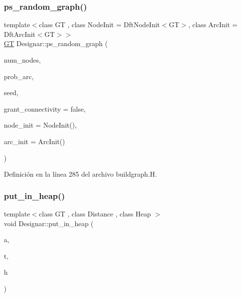 \subsubsection{\texorpdfstring{ps\+\_\+random\+\_\+graph()}{ps\_random\_graph()}\hspace{0.1cm}{\footnotesize\ttfamily [2/2]}}
{\footnotesize\ttfamily template$<$class GT , class Node\+Init  = Dft\+Node\+Init$<$\+G\+T$>$, class Arc\+Init  = Dft\+Arc\+Init$<$\+G\+T$>$$>$ \\
\hyperlink{demo-buildgraph_8_c_a3001c40d2c31ca87ed96cd7d1334a55e}{GT} Designar\+::ps\+\_\+random\+\_\+graph (\begin{DoxyParamCaption}\item[{\hyperlink{namespace_designar_aa72662848b9f4815e7bf31a7cf3e33d1}{nat\+\_\+t}}]{num\+\_\+nodes,  }\item[{\hyperlink{namespace_designar_aca2c32af26808dbec1f3a3071fad25ce}{real\+\_\+t}}]{prob\+\_\+arc,  }\item[{\hyperlink{namespace_designar_ad621b5646d45288c5d6a1e1dfe7531a8}{rng\+\_\+seed\+\_\+t}}]{seed,  }\item[{bool}]{grant\+\_\+connectivity = {\ttfamily false},  }\item[{Node\+Init \&\&}]{node\+\_\+init = {\ttfamily NodeInit()},  }\item[{Arc\+Init \&\&}]{arc\+\_\+init = {\ttfamily ArcInit()} }\end{DoxyParamCaption})}



Definición en la línea 285 del archivo buildgraph.\+H.

\mbox{\label{namespace_designar_a5a953a5892c101d5207d0844b367af70}} 
\subsubsection{\texorpdfstring{put\+\_\+in\+\_\+heap()}{put\_in\_heap()}}
{\footnotesize\ttfamily template$<$class GT , class Distance , class Heap $>$ \\
void Designar\+::put\+\_\+in\+\_\+heap (\begin{DoxyParamCaption}\item[{\hyperlink{namespace_designar_a3f55fb5513d62ff47cbc8f72b8e95d6f}{Arc}$<$ \hyperlink{demo-buildgraph_8_c_a3001c40d2c31ca87ed96cd7d1334a55e}{GT} $>$ \&}]{a,  }\item[{\hyperlink{namespace_designar_a5af326c65aa2bd26b26c410f2030d09e}{Node}$<$ \hyperlink{demo-buildgraph_8_c_a3001c40d2c31ca87ed96cd7d1334a55e}{GT} $>$ \&}]{t,  }\item[{Heap \&}]{h }\end{DoxyParamCaption})}




